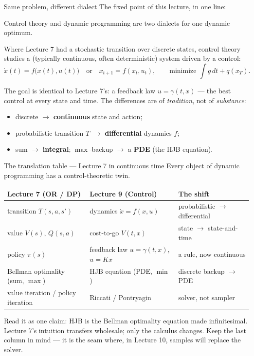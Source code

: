 \documentclass[10pt, aspectratio=169]{beamer}
\begin{document}
\begin{frame}{Same problem, different dialect}
The fixed point of this lecture, in one line:
\begin{center}\large
\alert{Control theory and dynamic programming are two dialects for one dynamic optimum.}
\end{center}
\medskip

\pause
Where Lecture 7 had a stochastic transition over discrete states, control theory studies a (typically continuous, often deterministic) system driven by a control:
\[
\dot x(t) = f\big(x(t), u(t)\big) \quad\text{or}\quad x_{t+1} = f(x_t, u_t), \qquad \text{minimize } \int g\,dt + q(x_T).
\]
\medskip

\pause
The goal is identical to Lecture 7's: a \alert{feedback law} $u = \gamma(t,x)$ --- the best control at every state and time. The differences are of \emph{tradition}, not of \emph{substance}:
\begin{itemize}\setlength\itemsep{1pt}
\item discrete $\to$ \textbf{continuous} state and action;
\item probabilistic transition $T$ $\to$ \textbf{differential} dynamics $f$;
\item sum $\to$ \textbf{integral}; $\max$-backup $\to$ a \textbf{PDE} (the HJB equation).
\end{itemize}
\end{frame}

\begin{frame}{The translation table --- Lecture 7 in continuous time}
Every object of dynamic programming has a control-theoretic twin.
\medskip
\begin{center}\scriptsize\renewcommand{\arraystretch}{1.55}
\begin{tabular}{l|l|l}
\textbf{Lecture 7 (OR / DP)} & \textbf{Lecture 9 (Control)} & \textbf{The shift} \\
\hline
transition $T(s,a,s')$ & dynamics $\dot x = f(x,u)$ & probabilistic $\to$ differential \\
value $V(s)$, $Q(s,a)$ & cost-to-go $V(t,x)$ & state $\to$ state-and-time \\
policy $\pi(s)$ & feedback law $u=\gamma(t,x)$, $u=Kx$ & a rule, now continuous \\
Bellman optimality (sum, $\max$) & HJB equation (PDE, $\min$) & discrete backup $\to$ PDE \\
value iteration / policy iteration & Riccati / Pontryagin & solver, not sampler \\
\end{tabular}
\end{center}
\medskip

\pause
Read it as one claim: \alert{HJB is the Bellman optimality equation made infinitesimal.} Lecture 7's intuition transfers wholesale; only the calculus changes. Keep the last column in mind --- it is the seam where, in Lecture 10, samples will replace the solver.
\end{frame}
\end{document}
